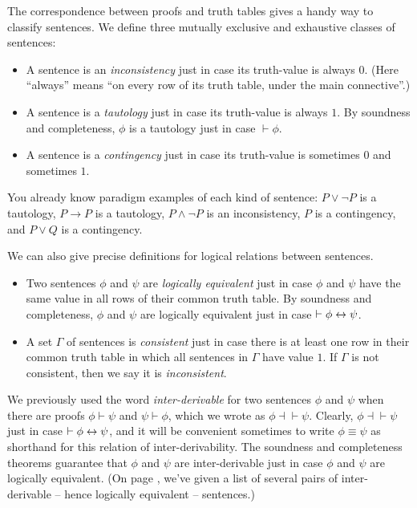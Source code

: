 The correspondence between proofs and truth tables gives a
handy way to classify sentences.  We define three mutually
exclusive and exhaustive classes of sentences:
\begin{itemize}
\item A sentence is an \emph{\gls{inconsistency}} just in case its
  truth-value is always $0$.  (Here ``always'' means ``on every row of
  its truth table, under the main connective''.)
\item A sentence is a \emph{\gls{tautology}} just in case its
  truth-value is always $1$.  By soundness and completeness, $\phi$ is
  a tautology just in case $\vdash\phi$.
\item A sentence is a \emph{\gls{contingency}} just in case its
  truth-value is sometimes $0$ and sometimes $1$.
\end{itemize}
You already know paradigm examples of each kind of sentence:
$P\vee\neg P$ is a tautology, $P\to P$ is a tautology, $P\wedge\neg P$
is an inconsistency, $P$ is a contingency, and $P\vee Q$ is a
contingency.

We can also give precise definitions for logical relations between
sentences.
\begin{itemize}
\item Two sentences $\phi$ and $\psi$ are \emph{logically equivalent} just in
  case $\phi$ and $\psi$ have the same value in all rows of their
  common truth table.  By soundness and completeness, $\phi$ and
  $\psi$ are logically equivalent just in case $\vdash \phi\leftrightarrow\psi$.
\item A set $\Gamma$ of sentences is \emph{consistent} just in case
  there is at least one row in their common truth table in which all
  sentences in $\Gamma$ have value $1$.  If $\Gamma$ is not
  consistent, then we say it is \emph{inconsistent}.    
\end{itemize}

We previously used the word \emph{inter-derivable} for two sentences
$\phi$ and $\psi$ when there are proofs $\phi\vdash\psi$ and
$\psi\vdash\phi$, which we wrote as $\phi\dashv\vdash\psi$.  Clearly,
$\phi\dashv\vdash\psi$ just in case $\vdash\phi\leftrightarrow\psi$, and it will
be convenient sometimes to write $\phi\equiv\psi$ as shorthand for
this relation of inter-derivability.  The soundness and completeness
theorems guarantee that $\phi$ and $\psi$ are inter-derivable just in
case $\phi$ and $\psi$ are logically equivalent.  (On page
\pageref{equivs}, we've given a list of several pairs of
inter-derivable -- hence logically equivalent -- sentences.)

